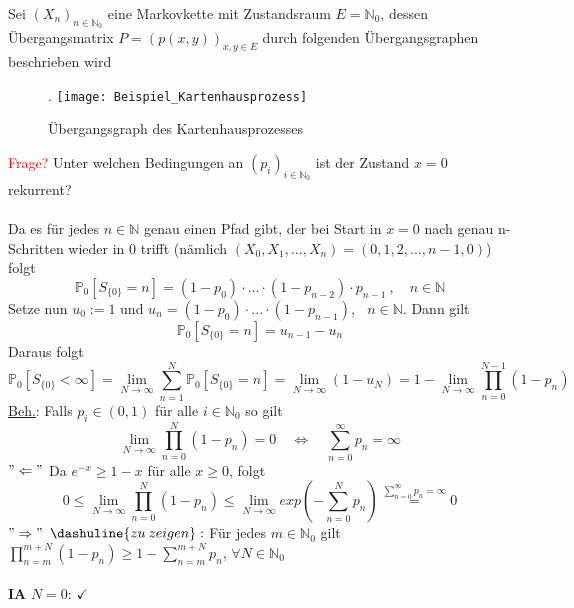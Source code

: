 Sei $(X_{n})_{n \in \mathbb{N}_{0}}$ eine Markovkette mit Zustandsraum $E = \mathbb{N}_{0}$, dessen Übergangsmatrix $P = (p(x,y))_{x,y \in E}$ durch folgenden Übergangsgraphen beschrieben wird
\begin{figure}[H].
\centering
\texttt{[image: Beispiel\_Kartenhausprozess]}
\caption{Übergangsgraph des Kartenhausprozesses}
\end{figure}
\noindent
\textcolor{red}{Frage?} Unter welchen Bedingungen an $(p_{i})_{i \in \mathbb{N}_{0}}$ ist der Zustand $x=0$ rekurrent?
\\
\\
Da es für jedes $n \in \mathbb{N}$ genau einen Pfad gibt, der bei Start in $x=0$ nach genau n-Schritten wieder in 0 trifft (nämlich $(X_{0},X_{1},...,X_{n}) = (0,1,2,...,n-1,0)$) folgt
\begin{equation*}
\mathbb{P}_{0} [S_{\lbrace 0 \rbrace} = n] = (1-p_{0}) \cdot ... \cdot (1-p_{n-2}) \cdot p_{n-1} \: , \quad n \in \mathbb{N}
\end{equation*} 
Setze nun $u_{0} := 1$ und $u_{n} = (1-p_{0}) \cdot ... \cdot (1-p_{n-1})$, $\:$ $n \in \mathbb{N}$. Dann gilt
\begin{equation*}
\mathbb{P}_{0} [S_{\lbrace 0 \rbrace} = n] = u_{n-1} - u_{n}
\end{equation*}
Daraus folgt
\begin{equation*}
\mathbb{P}_{0} [S_{\lbrace 0 \rbrace} < \infty] = \lim_{N \to \infty} \sum_{n=1}^{N} \mathbb{P}_{0} [S_{\lbrace 0 \rbrace} = n] = \lim_{N \to \infty}(1-u_{N}) = 1 - \lim_{N \to \infty } \prod_{n=0}^{N-1}  (1 - p_{n})
\end{equation*}
\underline{Beh.}: Falls $p_{i} \in (0,1)$ für alle $i \in \mathbb{N}_{0}$ so gilt
\begin{equation*}
\lim_{N \to \infty} \prod_{n=0}^{N} (1-p_{n}) = 0 \quad \Leftrightarrow \quad \sum_{n=0}^{\infty} p_{n} = \infty
\end{equation*}
$"\Leftarrow"$ Da $e^{-x} \geq 1-x$ für alle $x \geq 0$, folgt
\begin{equation*}
0 \leq \lim_{N \to \infty} \prod_{n=0}^{N} (1-p_{n}) \leq \lim_{N \to \infty} exp(-\sum_{n=0}^{N}p_{n}) \stackrel{\sum_{n=0}^{\infty}p_{n} = \infty}{=} 0
\end{equation*}
$"\Rightarrow"$ $\dashuline{zu \: zeigen}:$ Für jedes $m \in \mathbb{N}_{0}$ gilt $\prod_{n=m}^{m+N}(1-p_{n}) \geq 1 - \sum_{n=m}^{m+N}p_{n}$, $\forall N \in \mathbb{N}_{0}$
\\
\\
\textbf{IA} $N=0$: $\checkmark$

